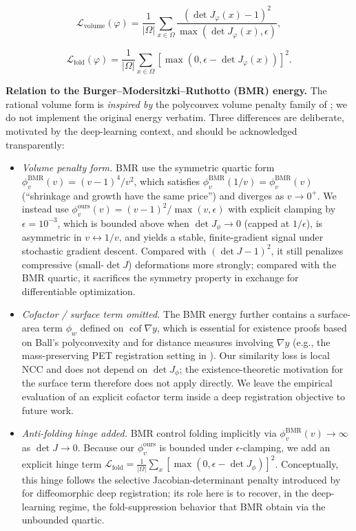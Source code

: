 \documentclass[jimaging,article,submit,pdftex,moreauthors]{Definitions/mdpi}
\begin{document}
\begin{linenomath}
\begin{equation}
\mathcal{L}_{\mathrm{volume}}(\varphi)=\frac{1}{|\Omega|}\sum_{x\in\Omega}\frac{(\det J_{\varphi}(x)-1)^2}{\max(\det J_{\varphi}(x),\epsilon)},
\end{equation}
\end{linenomath}
\begin{linenomath}
\begin{equation}
\mathcal{L}_{\mathrm{fold}}(\varphi)=\frac{1}{|\Omega|}\sum_{x\in\Omega}\left[\max(0,\epsilon-\det J_{\varphi}(x))\right]^2.
\end{equation}
\end{linenomath}
\noindent\textbf{Relation to the Burger--Modersitzki--Ruthotto (BMR) energy.}
The rational volume form is \emph{inspired by} the polyconvex volume penalty family of \citet{burger2013hyperelastic}; we do not implement the original energy verbatim. Three differences are deliberate, motivated by the deep-learning context, and should be acknowledged transparently:
\begin{itemize}\setlength\itemsep{2pt}
\item \emph{Volume penalty form.} BMR use the symmetric quartic form $\phi^{\mathrm{BMR}}_v(v)=(v-1)^4/v^2$, which satisfies $\phi^{\mathrm{BMR}}_v(1/v)=\phi^{\mathrm{BMR}}_v(v)$ (``shrinkage and growth have the same price'') and diverges as $v\to 0^+$. We instead use $\phi^{\mathrm{ours}}_v(v)=(v-1)^2/\max(v,\epsilon)$ with explicit clamping by $\epsilon=10^{-3}$, which is bounded above when $\det J_\phi\to 0$ (capped at $1/\epsilon$), is asymmetric in $v\leftrightarrow 1/v$, and yields a stable, finite-gradient signal under stochastic gradient descent. Compared with $(\det J-1)^2$, it still penalizes compressive (small-$\det J$) deformations more strongly; compared with the BMR quartic, it sacrifices the symmetry property in exchange for differentiable optimization.
\item \emph{Cofactor / surface term omitted.} The BMR energy further contains a surface-area term $\phi_w$ defined on $\operatorname{cof}\nabla y$, which is essential for existence proofs based on Ball's polyconvexity and for distance measures involving $\nabla y$ (e.g., the mass-preserving PET registration setting in \citet{burger2013hyperelastic}). Our similarity loss is local NCC and does not depend on $\det J_\phi$; the existence-theoretic motivation for the surface term therefore does not apply directly. We leave the empirical evaluation of an explicit cofactor term inside a deep registration objective to future work.
\item \emph{Anti-folding hinge added.} BMR control folding implicitly via $\phi^{\mathrm{BMR}}_v(v)\to\infty$ as $\det J\to 0$. Because our $\phi^{\mathrm{ours}}_v$ is bounded under $\epsilon$-clamping, we add an explicit hinge term $\mathcal{L}_{\mathrm{fold}}=\frac{1}{|\Omega|}\sum_x[\max(0,\epsilon-\det J_\phi)]^2$. Conceptually, this hinge follows the selective Jacobian-determinant penalty introduced by \citet{mok2020fast} for diffeomorphic deep registration; its role here is to recover, in the deep-learning regime, the fold-suppression behavior that BMR obtain via the unbounded quartic.
\end{itemize}
\end{document}
